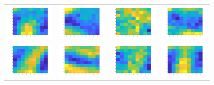 \documentclass{article} %
\begin{document}
\begin{figure}[H]
\begin{tabular}{cccc}
\\
\includegraphics[width=0.2\linewidth]{images/Fig_weights_9.png}
&
\includegraphics[width=0.2\linewidth]{images/Fig_weights_10.png}
&
\includegraphics[width=0.2\linewidth]{images/Fig_weights_11.png}
&
\includegraphics[width=0.2\linewidth]{images/Fig_weights_12.png}
\\
\includegraphics[width=0.2\linewidth]{images/Fig_weights_13.png}
&
\includegraphics[width=0.2\linewidth]{images/Fig_weights_14.png}
&
\includegraphics[width=0.2\linewidth]{images/Fig_weights_15.png}
&
\includegraphics[width=0.2\linewidth]{images/Fig_weights_16.png}

\end{tabular}
\end{figure}
\end{document}
